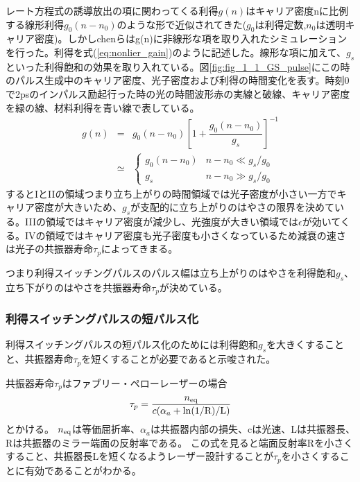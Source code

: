 レート方程式の誘導放出の項に関わってくる利得$g(n)$はキャリア密度nに比例する線形利得$g_{0}(n-n_{0})$のような形で近似されてきた($g_{0}$は利得定数,$n_{0}$は透明キャリア密度)。しかしchenらはg(n)に非線形な項を取り入れたシミュレーションを行った。利得を式(\ref{eq:nonlier_gain})のように記述した。線形な項に加えて、$g_{s}$といった利得飽和の効果を取り入れている。図\ref{fig:fig_1_1_GS_pulse}にこの時のパルス生成中のキャリア密度、光子密度および利得の時間変化を表す。時刻0で2psのインパルス励起行った時の光の時間波形赤の実線と破線、キャリア密度を緑の線、材料利得を青い線で表している。
\begin{eqnarray}
g(n)&=&g_{0}(n-n_{0})\left[1+\dfrac{g_{0}(n-n_{0})}{g_{s}}\right]^{-1}\\
\label{eq:nonlier_gain}
&\simeq &\left\{
\begin{array}{ll}
 g_{0}(n-n_{0}) & n-n_{0}\ll g_{s}/g_{0}\nonumber \\
g_{s} & n-n_{0}\gg g_{s}/g_{0}\nonumber
\end{array}
\right.
\end{eqnarray}
するとIとIIの領域つまり立ち上がりの時間領域では光子密度が小さい一方でキャリア密度が大きいため、$g_{s}$が支配的に立ち上がりのはやさの限界を決めている。IIIの領域ではキャリア密度が減少し、光強度が大きい領域では$\epsilon$が効いてくる。IVの領域ではキャリア密度も光子密度も小さくなっているため減衰の速さは光子の共振器寿命$\tau_{p}$によってきまる。

つまり利得スイッチングパルスのパルス幅は立ち上がりのはやさを利得飽和$g_{s}$、立ち下がりのはやさを共振器寿命$\tau_{p}$が決めている。
\newpage

\subsubsection{利得スイッチングパルスの短パルス化}
利得スイッチングパルスの短パルス化のためには利得飽和$g_{s}$を大きくすることと、共振器寿命$\tau_{p}$を短くすることが必要であると示唆された。

共振器寿命$\tau_{p}$はファブリー・ペローレーザーの場合
\begin{eqnarray}
\tau_{p}=\dfrac{n_{\rm{eq}}}{c(\alpha_{a}+\rm{ln}(1/R)/L)}
\label{eq:tau_p}
\end{eqnarray}
とかける\cite{ref_iga}。
$n_{\rm{eq}}$は等価屈折率、$\alpha_{a}$は共振器内部の損失、cは光速、Lは共振器長、Rは共振器のミラー端面の反射率である。
この式を見ると端面反射率Rを小さくすること、共振器長Lを短くなるようレーザー設計することが$\tau_{p}$を小さくすることに有効であることがわかる。

